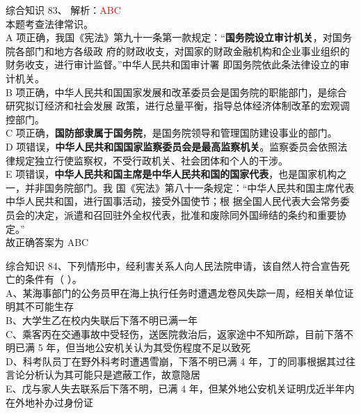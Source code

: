 \documentclass[aspectratio=169]{beamer}
\begin{document}
\begin{frame}[t]{综合知识}
    83、  解析：\textcolor{red}{ABC}\\
    {\small
    本题考查法律常识。\\
    A 项正确，我国《宪法》第九十一条第一款规定：“\textbf{国务院设立审计机关}，对国务院各部门和地方各级政
    府的财政收支，对国家的财政金融机构和企业事业组织的财务收支，进行审计监督。”中华人民共和国审计署
    即国务院依此条法律设立的审计机关。\\
    B 项正确，中华人民共和国国家发展和改革委员会是国务院的职能部门，是综合研究拟订经济和社会发展
    政策，进行总量平衡，指导总体经济体制改革的宏观调控部门。\\
    C 项正确，\textbf{国防部隶属于国务院}，是国务院领导和管理国防建设事业的部门。\\
    D 项错误，\textbf{中华人民共和国国家监察委员会是最高监察机关}。监察委员会依照法律规定独立行使监察权，不受行政机关、社会团体和个人的干涉。\\
    E 项错误，\textbf{中华人民共和国主席是中华人民共和国的国家代表}，也是国家机构之一，并非国务院部门。我
    国《宪法》第八十一条规定：“中华人民共和国主席代表中华人民共和国，进行国事活动，接受外国使节；根
    据全国人民代表大会常务委员会的决定，派遣和召回驻外全权代表，批准和废除同外国缔结的条约和重要协定。”\\
    故正确答案为 ABC\\
    }
\end{frame}                           


\begin{frame}[t]{综合知识}
    84、下列情形中，经利害关系人向人民法院申请，该自然人符合宣告死亡的条件有（ ）。                                                      \\
    A、某海事部门的公务员甲在海上执行任务时遭遇龙卷风失踪一周，经相关单位证明其不可能生存                                                \\
    B、大学生乙在校内失联后下落不明已满一年                                                                                              \\
    C、乘客丙在交通事故中受轻伤，送医院救治后，返家途中不知所踪，目前下落不明已满 5 年，但当地公安机关认为其受伤程度不足以致死           \\
    D、科考队员丁在野外科考时遭遇雪崩，下落不明已满 4 年，丁的同事根据其过往言论分析认为其可能只是遮蔽工作，故意隐居                     \\
    E、戊与家人失去联系后下落不明，已满 4 年，但某外地公安机关证明戊近半年内在外地补办过身份证                                           \\
\end{frame}                           
\end{document}
